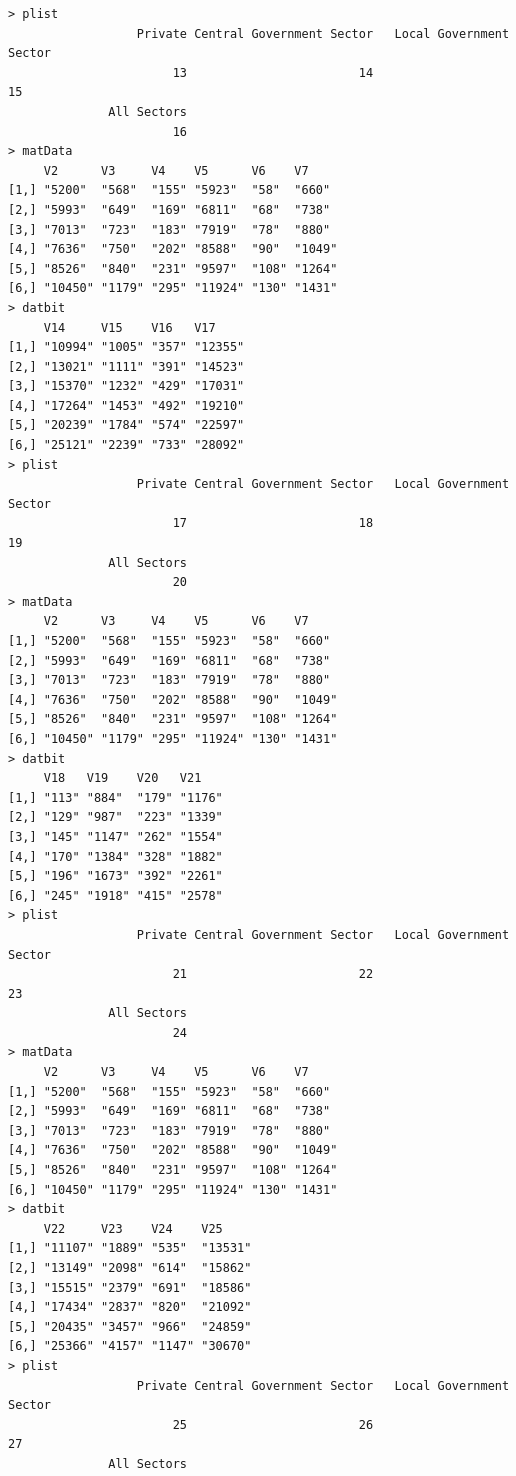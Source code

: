 \documentclass[a4paper]{article}
\begin{document}
\begin{verbatim}
> plist 
                  Private Central Government Sector   Local Government Sector 
                       13                        14                        15 
              All Sectors 
                       16 
> matData 
     V2      V3     V4    V5      V6    V7    
[1,] "5200"  "568"  "155" "5923"  "58"  "660" 
[2,] "5993"  "649"  "169" "6811"  "68"  "738" 
[3,] "7013"  "723"  "183" "7919"  "78"  "880" 
[4,] "7636"  "750"  "202" "8588"  "90"  "1049"
[5,] "8526"  "840"  "231" "9597"  "108" "1264"
[6,] "10450" "1179" "295" "11924" "130" "1431"
> datbit 
     V14     V15    V16   V17    
[1,] "10994" "1005" "357" "12355"
[2,] "13021" "1111" "391" "14523"
[3,] "15370" "1232" "429" "17031"
[4,] "17264" "1453" "492" "19210"
[5,] "20239" "1784" "574" "22597"
[6,] "25121" "2239" "733" "28092"
> plist 
                  Private Central Government Sector   Local Government Sector 
                       17                        18                        19 
              All Sectors 
                       20 
> matData 
     V2      V3     V4    V5      V6    V7    
[1,] "5200"  "568"  "155" "5923"  "58"  "660" 
[2,] "5993"  "649"  "169" "6811"  "68"  "738" 
[3,] "7013"  "723"  "183" "7919"  "78"  "880" 
[4,] "7636"  "750"  "202" "8588"  "90"  "1049"
[5,] "8526"  "840"  "231" "9597"  "108" "1264"
[6,] "10450" "1179" "295" "11924" "130" "1431"
> datbit 
     V18   V19    V20   V21   
[1,] "113" "884"  "179" "1176"
[2,] "129" "987"  "223" "1339"
[3,] "145" "1147" "262" "1554"
[4,] "170" "1384" "328" "1882"
[5,] "196" "1673" "392" "2261"
[6,] "245" "1918" "415" "2578"
> plist 
                  Private Central Government Sector   Local Government Sector 
                       21                        22                        23 
              All Sectors 
                       24 
> matData 
     V2      V3     V4    V5      V6    V7    
[1,] "5200"  "568"  "155" "5923"  "58"  "660" 
[2,] "5993"  "649"  "169" "6811"  "68"  "738" 
[3,] "7013"  "723"  "183" "7919"  "78"  "880" 
[4,] "7636"  "750"  "202" "8588"  "90"  "1049"
[5,] "8526"  "840"  "231" "9597"  "108" "1264"
[6,] "10450" "1179" "295" "11924" "130" "1431"
> datbit 
     V22     V23    V24    V25    
[1,] "11107" "1889" "535"  "13531"
[2,] "13149" "2098" "614"  "15862"
[3,] "15515" "2379" "691"  "18586"
[4,] "17434" "2837" "820"  "21092"
[5,] "20435" "3457" "966"  "24859"
[6,] "25366" "4157" "1147" "30670"
> plist 
                  Private Central Government Sector   Local Government Sector 
                       25                        26                        27 
              All Sectors 

\end{verbatim}
\end{document}
